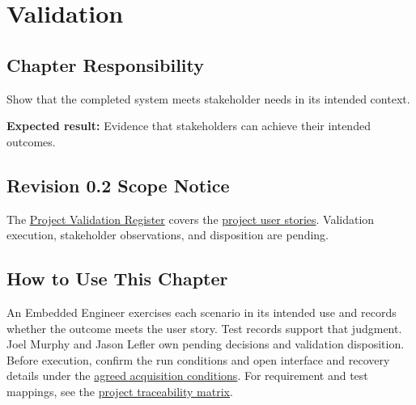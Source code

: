 \chapter{Validation}
\section{Chapter Responsibility}
\label{Section:ValidationResponsibility}
Show that the completed system meets stakeholder needs in its intended context.

\noindent\textbf{Expected result:} Evidence that stakeholders can achieve their intended outcomes.

\section{Revision 0.2 Scope Notice}
\label{Section:DeferredValidation}
\begin{fsaNote}
The \hyperref[Table:ValidationRegister]{Project Validation Register} covers
the \hyperref[Section:ProjectDraftStories]{project user stories}. Validation
execution, stakeholder observations, and disposition are pending.
\end{fsaNote}

\section{How to Use This Chapter}
An Embedded Engineer exercises each scenario in its intended use and records
whether the outcome meets the user story. Test records support that judgment.
Joel Murphy and Jason Lefler own pending decisions and validation disposition.
Before execution, confirm the run conditions and open interface and recovery
details under the \hyperref[Section:ProjectAcquisitionConditions]{agreed
acquisition conditions}. For requirement and test mappings, see the
\hyperref[Table:ProjectRequirementTraceability]{project traceability matrix}.

